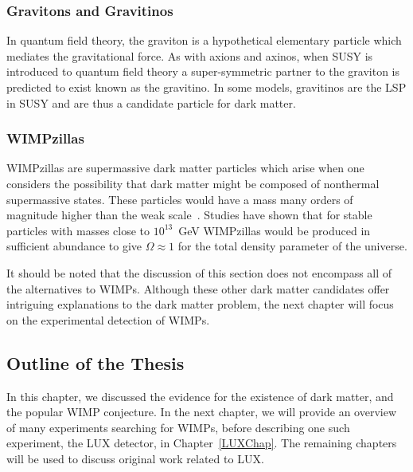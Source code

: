 

\subsubsection{Gravitons and Gravitinos}
In quantum field theory, the graviton is a hypothetical  elementary particle which mediates the gravitational force.  As with axions and axinos, when SUSY is introduced to quantum field theory a super-symmetric partner to the graviton is predicted to exist known as the gravitino.  In some models, gravitinos are the LSP in SUSY and are thus a candidate particle for dark matter.

\subsubsection{WIMPzillas}
WIMPzillas are supermassive dark matter particles which arise when one considers the possibility that dark matter might be composed of nonthermal supermassive states. These particles would have a mass many orders of magnitude higher than the weak scale~\cite{Chung}. Studies have shown that for stable particles with masses close to $10^{13}$~GeV  WIMPzillas would be produced in sufficient abundance to give $\Omega \approx 1$ for the total density parameter of the universe.  

It should be noted that the discussion of this section does not encompass all of the alternatives to WIMPs.   Although these other dark matter candidates offer intriguing explanations to the dark matter problem, the next chapter will focus on the experimental detection of WIMPs.


\subsection{Outline of the Thesis}

In this chapter, we discussed the evidence for the existence of dark matter, and the popular WIMP conjecture.  In the next chapter, we will provide an overview of many experiments searching for WIMPs, before describing one such experiment, the LUX detector, in Chapter~\ref{LUXChap}. The remaining chapters will be used to discuss original work related to LUX. 

